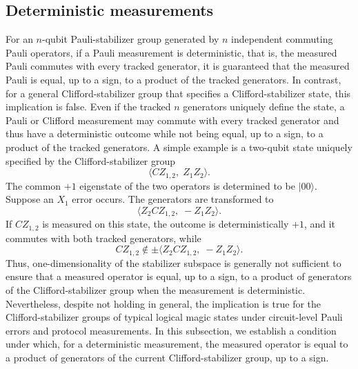 \documentclass[
 reprint,
 amsmath,amssymb,
 pra,superscriptaddress, nofootinbib
]{revtex4-2}
\theoremstyle{definition}
\theoremstyle{plain}
\begin{document}
\subsection{Deterministic measurements}
\label{subsec:deterministic}
For an $n$-qubit Pauli-stabilizer group generated by $n$ independent commuting Pauli operators, if a Pauli measurement is deterministic, that is, the measured Pauli commutes with every tracked generator, it is guaranteed that the measured Pauli is equal, up to a sign, to a product of the tracked generators.
In contrast, for a general Clifford-stabilizer group that specifies a Clifford-stabilizer state, this implication is false. Even if the tracked $n$ generators uniquely define the state, a Pauli or Clifford measurement may commute with every tracked generator and thus have a deterministic outcome while not being equal, up to a sign, to a product of the tracked generators.
A simple example is a two-qubit state uniquely specified by the Clifford-stabilizer group
\begin{equation}
\langle CZ_{1,2},\; Z_1Z_2\rangle .
\end{equation}
The common $+1$ eigenstate of the two operators is determined to be $|00\rangle$. 
Suppose an $X_1$ error occurs. The generators are transformed to 
\begin{equation}
\langle Z_2CZ_{1,2},\; -Z_1Z_2\rangle .
\end{equation}
If $CZ_{1,2}$ is measured on this state, the outcome is deterministically $+1$, and it commutes with both tracked generators, while
\begin{equation}
CZ_{1,2} \notin \pm\langle Z_2CZ_{1,2},\; -Z_1Z_2\rangle .
\end{equation}
Thus, one-dimensionality of the stabilizer subspace is generally not sufficient to ensure that a measured operator is equal, up to a sign, to a product of generators of the Clifford-stabilizer group when the measurement is deterministic. 
Nevertheless, despite not holding in general, the implication is true for the Clifford-stabilizer groups of typical logical magic states under circuit-level Pauli errors and protocol measurements.
In this subsection, we establish a condition under which, for a deterministic measurement, the measured operator is equal to a product of generators of the current Clifford-stabilizer group, up to a sign.
\end{document}
